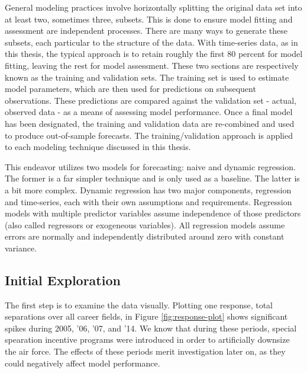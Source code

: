 \documentclass[12pt,letterpaper,toc=flat,oneside]{report}
\theoremstyle{definition}
\theoremstyle{definition}
\theoremstyle{definition}
\theoremstyle{remark}
\begin{document}
General modeling practices involve horizontally splitting the original
data set into at least two, sometimes three, subsets. This is done to
ensure model fitting and assessment are independent processes. There are
many ways to generate these subsets, each particular to the structure of
the data. With time-series data, as in this thesis, the typical approach
is to retain roughly the first 80 percent for model fitting, leaving the
rest for model assessment. These two sections are respectively known as
the training and validation sets. The training set is used to estimate
model parameters, which are then used for predictions on subsequent
observations. These predictions are compared against the validation set
- actual, observed data - as a means of assessing model performance.
Once a final model has been designated, the training and validation data
are re-combined and used to produce out-of-sample forecasts. The
training/validation approach is applied to each modeling technique
discussed in this thesis.

This endeavor utilizes two models for forecasting: naive and dynamic
regression. The former is a far simpler technique and is only used as a
baseline. The latter is a bit more complex. Dynamic regression has two
major components, regression and time-series, each with their own
assumptions and requirements. Regression models with multiple predictor
variables assume independence of those predictors (also called
regressors or exogeneous variables). All regression models assume errors
are normally and independently distributed around zero with constant
variance.

\hypertarget{initial-exploration}{%
\subsection{Initial Exploration}\label{initial-exploration}}

The first step is to examine the data visually. Plotting one response,
total separations over all career fields, in Figure
\ref{fig:response-plot} shows significant spikes during 2005, '06, '07,
and '14. We know that during these periods, special spearation incentive
programs were introduced in order to artificially downsize the air
force. The effects of these periods merit investigation later on, as
they could negatively affect model performance.
\end{document}
